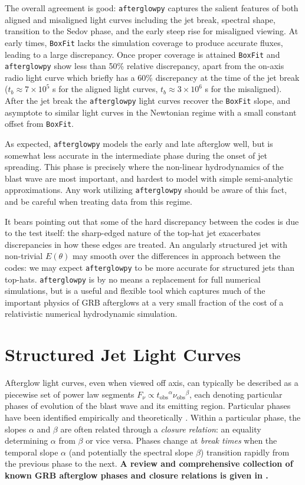 \documentclass[twocolumn]{aastex62}
\newcommand{\afterglowpy}{{\tt afterglowpy}}
\newcommand{\boxfit}{{\tt BoxFit}}
\newcommand{\tobs}{\ensuremath{t_{\mathrm{obs}}}}
\newcommand{\nuobs}{\ensuremath{\nu_{\mathrm{obs}}}}
\begin{document}
The overall agreement is good: \afterglowpy{} captures the salient features of both aligned and misaligned light curves including the jet break, spectral shape, transition to the Sedov phase, and the early steep rise for misaligned viewing.  
At early times, \boxfit{} lacks the simulation coverage to produce accurate fluxes, leading to a large discrepancy.  Once proper coverage is attained \boxfit{} and \afterglowpy{} show less than 50\% relative discrepancy, apart from the on-axis radio light curve which briefly has a 60\% discrepancy at the time of the jet break ($t_b \approx 7 \times 10^5$ s for the aligned light curves, $t_b \approx 3\times 10^6$ s for the misaligned).  After the jet break the \afterglowpy{} light curves recover the \boxfit{} slope, and asymptote to similar light curves in the Newtonian regime with a small constant offset from \boxfit{}.

As expected, \afterglowpy{} models the early and late afterglow well, but is somewhat less accurate in the intermediate phase during the onset of jet spreading. This phase is precisely where the non-linear hydrodynamics of the blast wave are most important, and hardest to model with simple semi-analytic approximations.  Any work utilizing \afterglowpy{} should be aware of this fact, and be careful when treating data from this regime.

It bears pointing out that some of the hard discrepancy between the codes is due to the test itself: the sharp-edged nature of the top-hat jet exacerbates discrepancies in how these edges are treated.  An angularly structured jet with non-trivial $E(\theta)$ may smooth over the differences in approach between the codes: we may expect \afterglowpy{} to be more accurate for structured jets than top-hats.  \afterglowpy{} is by no means a replacement for full numerical simulations, but is a useful and flexible tool which captures much of the important physics of GRB afterglows at a very small fraction of the cost of a relativistic numerical hydrodynamic simulation.

%
%

\section{Structured Jet Light Curves}\label{sec:structuredJets}

Afterglow light curves, even when viewed off axis, can typically be described as a piecewise set of power law segments $F_\nu \propto \tobs^\alpha \nuobs^\beta$, each denoting particular phases of evolution of the blast wave and its emitting region.  Particular phases have been identified empirically \citep{Nousek:2006aa} and theoretically \citep[e.g.][]{Zhang:2006aa}.   Within a particular phase, the slopes $\alpha$ and $\beta$ are often related through a \emph{closure relation}: an equality determining $\alpha$ from $\beta$ or vice versa.  Phases change at \emph{break times} when the temporal slope $\alpha$ (and potentially the spectral slope $\beta$) transition rapidly from the previous phase to the next. {\bf A review and comprehensive collection of known GRB afterglow phases and closure relations is given in \citet{Gao:2013aa}.}
\end{document}

